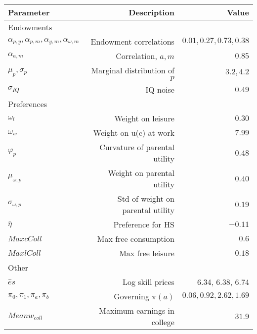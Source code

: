 \begin{tabular}{lrr}
\hline
Parameter & Description  & Value  \\ 
\hline
Endowments &   &   \\ 
$\alpha_{p,y}, \alpha_{p,m}, \alpha_{y,m}, \alpha_{\omega,m}$ & Endowment correlations  & $0.01, 0.27, 0.73, 0.38$  \\ 
$\alpha_{a,m}$ & Correlation, $a,m$  & $0.85$  \\ 
$\mu_{p}, \sigma_{p}$ & Marginal distribution of $p$  & $3.2, 4.2$  \\ 
$\sigma_{IQ}$ & IQ noise  & $0.49$  \\ 
Preferences &   &   \\ 
$\omega_{l}$ & Weight on leisure  & $0.30$  \\ 
$\omega_{w}$ & Weight on u(c) at work  & $7.99$  \\ 
$\varphi_{p}$ & Curvature of parental utility  & $0.48$  \\ 
$\mu_{\omega,p}$ & Weight on parental utility  & $0.40$  \\ 
$\sigma_{\omega,p}$ & Std of weight on parental utility  & $0.19$  \\ 
$\bar{\eta}$ & Preference for HS  & $-0.11$  \\ 
$Max cColl$ & Max free consumption  & $0.6$  \\ 
$Max lColl$ & Max free leisure  & $0.18$  \\ 
Other &   &   \\ 
$\hat{e}{s}$ & Log skill prices  & 6.34, 6.38, 6.74  \\ 
$\pi_{0}, \pi_{1}, \pi_{a}, \pi_{b}$ & Governing $\pi(a)$  & $0.06, 0.92, 2.62, 1.69$  \\ 
$Mean w_{coll}$ & Maximum earnings in college  & $31.9$  \\ 
\hline
\end{tabular}%
